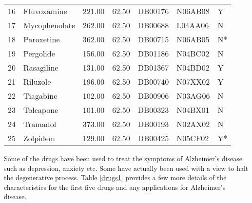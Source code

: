 \documentclass[preprint,12pt]{elsarticle}
\begin{document}
\begin{table}[h]
\begin{tabular}{rlrrlll}
  16 & Fluvoxamine & 221.00 & 62.50 & DB00176 & N06AB08&Y\\ 
  17 & Mycophenolate& 262.00 & 62.50 & DB00688 & L04AA06&N \\ 
  18 & Paroxetine & 362.00 & 62.50 & DB00715 & N06AB05 &N*\\ 
  19 & Pergolide & 156.00 & 62.50 & DB01186 & N04BC02& N\\ 
  20 & Rasagiline & 131.00 & 62.50 & DB01367 & N04BD02 &Y\\ 
  21 & Riluzole & 196.00 & 62.50 & DB00740 & N07XX02 &Y\\ 
  22 & Tiagabine & 102.00 & 62.50 & DB00906 & N03AG06&N \\ 
  23 & Tolcapone & 101.00 & 62.50 & DB00323 & N04BX01 &N\\ 
  24 & Tramadol & 373.00 & 62.50 & DB00193 & N02AX02 &N\\ 
  25 & Zolpidem & 129.00 & 62.50 & DB00425 & N05CF02 &Y*\\  
   \hline
\end{tabular} \normalsize
\label{drugs2repos}
\end{table}

Some of the drugs have been used to treat the symptoms of Alzheimer's disease such as depression, anxiety etc. Some have actually been used with a view to halt the degenerative process. Table \ref{drugs1}  provides a few more details of the characteristics for the first five drugs and any applications for Alzheimer's disease. 
\end{document}
